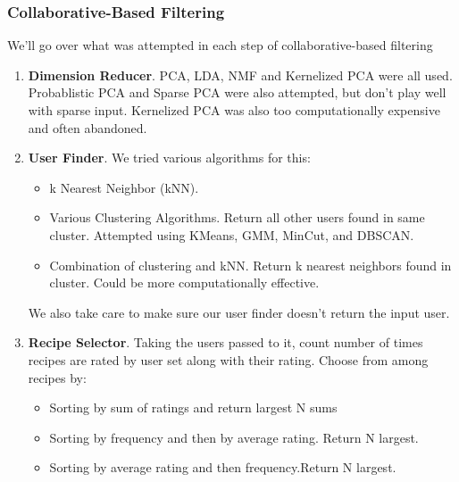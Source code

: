 \documentclass[11pt]{article}
\begin{document}
\subsubsection{Collaborative-Based Filtering}
We'll go over what was attempted in each step of collaborative-based filtering
\begin{enumerate}
    \item \textbf{Dimension Reducer}. PCA, LDA, NMF and Kernelized PCA were all used. Probablistic PCA and Sparse PCA were also attempted, but don't play well with sparse input. Kernelized PCA was also too computationally expensive and often abandoned.
    \item \textbf{User Finder}. We tried various algorithms for this:
    \begin{itemize}
        \item k Nearest Neighbor (kNN).
        \item Various Clustering Algorithms. Return all other users found in same cluster. Attempted using KMeans, GMM, MinCut, and DBSCAN.
        \item Combination of clustering and kNN. Return k nearest neighbors found in cluster. Could be more computationally effective.
    \end{itemize}
    We also take care to make sure our user finder doesn't return the input user.
    \item \textbf{Recipe Selector}. Taking the users passed to it, count number of times recipes are rated by user set along with their rating. Choose from among recipes by:
    \begin{itemize}
        \item Sorting by sum of ratings and return largest N sums
        \item Sorting by frequency and then by average rating. Return N largest.
        \item Sorting by average rating and then frequency.Return N largest.
    \end{itemize}
\end{enumerate}
\end{document}

